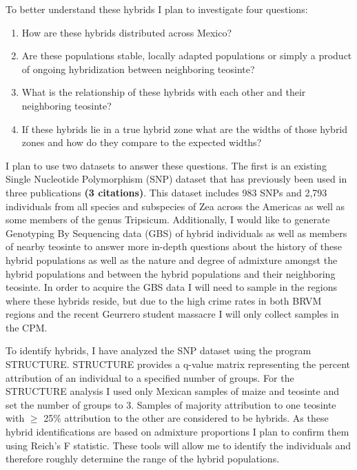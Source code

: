 \documentclass[12pt]{amsart}
\begin{document}
To better understand these hybrids I plan to investigate four questions: 
\begin{enumerate} 
	\item How are these hybrids distributed across Mexico? 
	\item Are these populations stable, locally adapted populations or simply a product of ongoing hybridization between neighboring teosinte?
	\item What is the relationship of these hybrids with each other and their neighboring teosinte?
	\item If these hybrids lie in a true hybrid zone what are the widths of those hybrid zones and how do they compare to the expected widths?
\end{enumerate} 

I plan to use two datasets to answer these questions.  
The first is an existing Single Nucleotide Polymorphism (SNP) dataset that has previously been used in three publications \textbf{(3 citations)}.  
This dataset includes 983 SNPs and 2,793 individuals from all species and subspecies of Zea across the Americas as well as some members of the genus Tripsicum.  
Additionally, I would like to generate Genotyping By Sequencing data (GBS) of hybrid individuals as well as members of nearby teosinte to answer more in-depth questions about the history of these hybrid populations as well as the nature and degree of admixture amongst the hybrid populations and between the hybrid populations and their neighboring teosinte.  
In order to acquire the GBS data I will need to sample in the regions where these hybrids reside, but due to the high crime rates in both BRVM regions and the recent Geurrero student massacre I will only collect samples in the CPM.%

To identify hybrids, I have analyzed the SNP dataset using the program STRUCTURE.  STRUCTURE provides a q-value matrix representing the percent attribution of an individual to a specified number of groups.  
For the STRUCTURE analysis I used only Mexican samples of maize and teosinte and set the number of groups to 3.
Samples of majority attribution to one teosinte with $\geq$ 25\% attribution to the other are considered to be hybrids.
As these hybrid identifications are based on admixture proportions I plan to confirm them using Reich's F statistic.
These tools will allow me to identify the individuals and therefore roughly determine the range of the hybrid populations.
\end{document}
